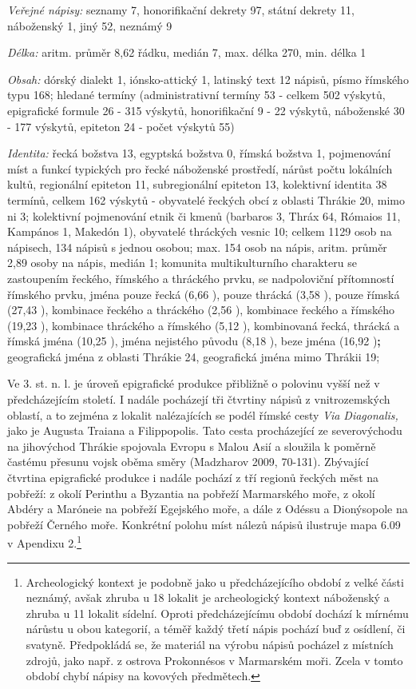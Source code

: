 {\em Veřejné nápisy:} seznamy 7, honorifikační dekrety 97, státní dekrety 11, náboženský 1, jiný 52, neznámý 9

{\em Délka:} aritm. průměr 8,62 řádku, medián 7, max. délka 270, min. délka 1

{\em Obsah:} dórský dialekt 1, iónsko-attický 1, latinský text 12 nápisů, písmo římského typu 168; hledané termíny (administrativní termíny 53 - celkem 502 výskytů, epigrafické formule 26 - 315 výskytů, honorifikační 9 - 22 výskytů, náboženské 30 - 177 výskytů, epiteton 24 - počet výskytů 55)

{\em Identita:} řecká božstva 13, egyptská božstva 0, římská božstva 1, pojmenování míst a funkcí typických pro řecké náboženské prostředí, nárůst počtu lokálních kultů, regionální epiteton 11, subregionální epiteton 13, kolektivní identita 38 termínů, celkem 162 výskytů - obyvatelé řeckých obcí z oblasti Thrákie 20, mimo ni 3; kolektivní pojmenování etnik či kmenů (barbaros 3, Thráx 64, Rómaios 11, Kampános 1, Makedón 1), obyvatelé thráckých vesnic 10; celkem 1129 osob na nápisech, 134 nápisů s jednou osobou; max. 154 osob na nápis, aritm. průměr 2,89 osoby na nápis, medián 1; komunita multikulturního charakteru se zastoupením řeckého, římského a thráckého prvku, se nadpoloviční přítomností římského prvku, jména pouze řecká (6,66 ), pouze thrácká (3,58 ), pouze římská (27,43 ), kombinace řeckého a thráckého (2,56 ), kombinace řeckého a římského (19,23 ), kombinace thráckého a římského (5,12 ), kombinovaná řecká, thrácká a římská jména (10,25 ), jména nejistého původu (8,18 ), beze jména (16,92 ){\bf ;} geografická jména z oblasti Thrákie 24, geografická jména mimo Thrákii 19;

\NC\AR
\HL
\HL
\stoptable

Ve 3. st. n. l. je úroveň epigrafické produkce přibližně o polovinu vyšší než v předcházejícím století. I nadále pocházejí tři čtvrtiny nápisů z vnitrozemských oblastí, a to zejména z lokalit nalézajících se podél římské cesty {\em Via Diagonalis,} jako je Augusta Traiana a Filippopolis. Tato cesta procházející ze severovýchodu na jihovýchod Thrákie spojovala Evropu s Malou Asií a sloužila k poměrně častému přesunu vojsk oběma směry (Madzharov 2009, 70-131). Zbývající čtvrtina epigrafické produkce i nadále pochází z tří regionů řeckých měst na pobřeží: z okolí Perinthu a Byzantia na pobřeží Marmarského moře, z okolí Abdéry a Maróneie na pobřeží Egejského moře, a dále z Odéssu a Dionýsopole na pobřeží Černého moře. Konkrétní polohu míst nálezů nápisů ilustruje mapa 6.09 v Apendixu 2.\footnote{Archeologický kontext je podobně jako u předcházejícího období z velké části neznámý, avšak zhruba u 18  lokalit je archeologický kontext náboženský a zhruba u 11  lokalit sídelní. Oproti předcházejícímu období dochází k mírnému nárůstu u obou kategorií, a téměř každý třetí nápis pochází buď z osídlení, či svatyně. Předpokládá se, že materiál na výrobu nápisů pocházel z místních zdrojů, jako např. z ostrova Prokonnésos v Marmarském moři. Zcela v tomto období chybí nápisy na kovových předmětech.}

